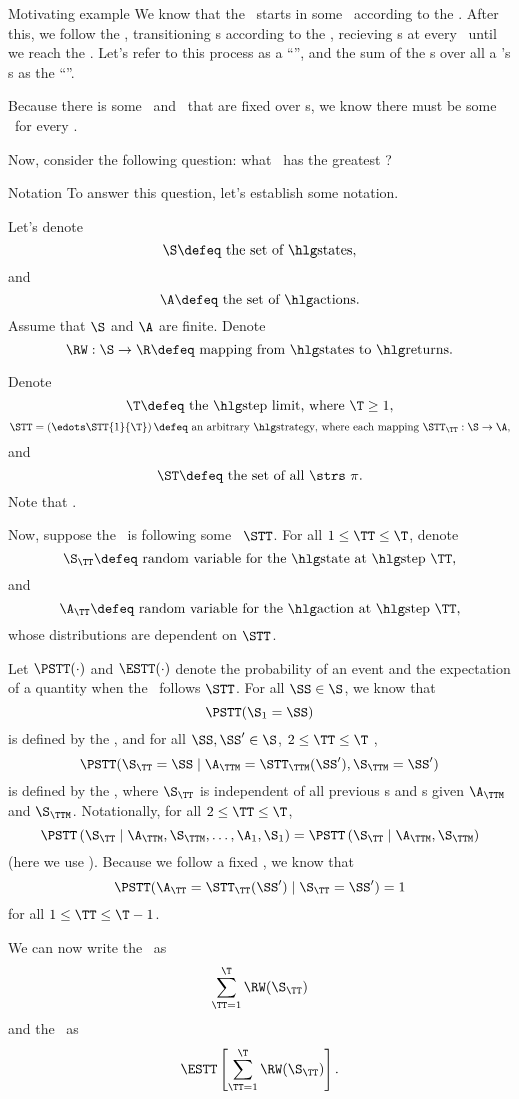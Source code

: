 \documentclass{rl_theory}
\begin{document}
\begin{part} {Motivating example}
  We know that the \agt\ starts in some \til\ according to the \ind.
  After this, we follow the \str, 
  transitioning \til{}s according to the \trd, recieving \rwd{}s 
  at every \til\ until
  we reach the \lmt. Let's refer to this process as a ``\run'', and
  the sum of the \rwd{}s over all a \run's \til{}s
  as the ``\trwd''.

  Because there is some \ind\ and \trd\ 
  that are fixed over \run{}s, 
  we know there must be 
  some \atrwd\ for every \str.

  Now, consider the following question: 
  what \str\ has the greatest \atrwd?
\end{part}

\newpage
\begin{part}{Notation}
  To answer this question, let's establish some notation.

  Let's denote
  $$\text{$\S \defeq$ the set of \til{}s},$$
  and 
  $$\text{$\A \defeq$ the set of \act{}s.}$$
  Assume that $\S$ and $\A$ are finite.
  Denote
  $$\text{$\RW : \S \rightarrow \R \defeq$ mapping from \til{}s to \rwd{}s.}$$

  Denote
  $$\text{$\T \defeq$ the \lmt, where $\T \ge 1$},$$
  $$\text{$\STT = \left(\edots\STT{1}{\T}\right) \defeq$ an arbitrary \str, 
  where each mapping $\STT_\TT : \S \rightarrow \A$},$$
  and
  $$\text{$\ST \defeq$ the set of all \strs\ $\pi$}.$$
  Note that .

  Now, suppose the \agt\ is following some \str\ $\STT$.
  For all $1 \le \TT \le \T$,
  denote
  $$\text{$\S_\TT \defeq$ random variable for the \til\ at \stp\ $\TT$},$$
  and
  $$\text{$\A_\TT \defeq$ random variable for the \act\ at \stp\ $\TT$},$$
  whose distributions are dependent on $\STT$.

  Let $\PSTT(\cdot)$ and $\ESTT(\cdot)$ denote the probability of an event
  and the expectation of a quantity
  when the \agt\ follows $\STT$.
  For all $\SS \in \S$, we know that
  $$\PSTT(\S_1 = \SS)$$
  is defined by the \ind, and
  for all $\SS, \SS' \in \S$, $2 \le \TT \le \T$ 
  ,
  $$\PSTT(\S_\TT = \SS \mid \A_\TTM = \STT_\TTM(\SS'), \S_\TTM = \SS')$$
  is defined by the \trd, where 
  $\S_\TT$ is independent of all previous \til{}s and \act{}s given $\A_\TTM$ and $\S_\TTM$.
  Notationally, for all $2 \le \TT \le \T$,
  $$ 
  \PSTT\left( \S_\TT \mid \A_{\TTM}, \S_{\TTM}, \ldots, \A_{1}, \S_{1} \right)
  = 
  \PSTT\left( \S_\TT \mid \A_{\TTM}, \S_{\TTM}\right)
  $$
  (here we use ).
  Because we follow a fixed \str, we know that
  $$\PSTT(\A_\TT = \STT_\TT(\SS') \mid \S_\TT = \SS') = 1$$
  for all
  $1 \le \TT \le \T - 1$.

  We can now write the \trwd\ as
  $$\sum_{\TT = 1}^\T \RW(\S_\TT)$$
  and the \atrwd\ as
  $$\ESTT\left[\sum_{\TT = 1}^\T \RW(\S_\TT)\right].$$
\end{part}
\end{document}
